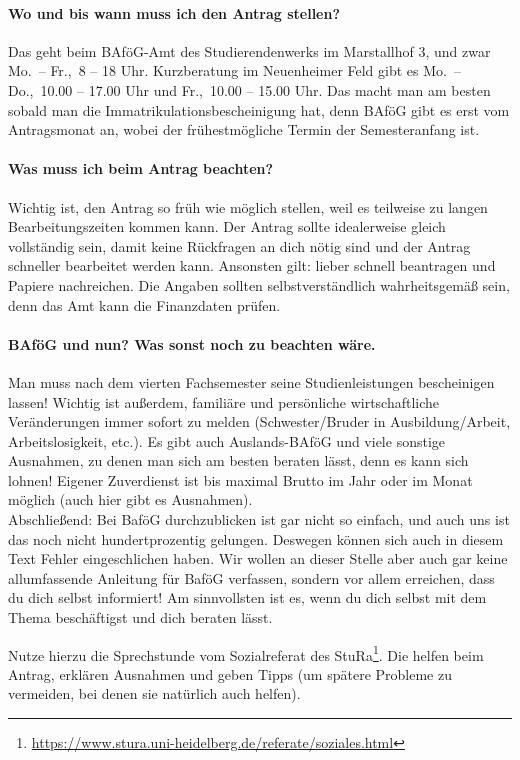 \paragraph{Wo und bis wann muss ich den Antrag stellen?}
Das geht beim BAföG-Amt des Studierendenwerks im Marstallhof 3, und zwar Mo.\ -- Fr.,\ 8 -- 18 Uhr. Kurzberatung im Neuenheimer Feld gibt es Mo.\ -- Do.,\ 10.00 -- 17.00 Uhr und Fr.,\ 10.00 -- 15.00 Uhr. Das macht man am besten sobald man die Immatrikulationsbescheinigung hat, denn BAföG gibt es erst vom Antragsmonat an, wobei der frühestmögliche Termin der Semesteranfang ist.

\paragraph{Was muss ich beim Antrag beachten?}
Wichtig ist, den Antrag so früh wie möglich stellen, weil es teilweise zu langen Bearbeitungszeiten kommen kann. Der Antrag sollte idealerweise gleich vollständig sein, damit keine Rückfragen an dich nötig sind und der Antrag schneller bearbeitet werden kann. Ansonsten gilt: lieber schnell beantragen und Papiere nachreichen. Die Angaben sollten selbstverständlich wahrheitsgemäß sein, denn das Amt kann die Finanzdaten prüfen.

\paragraph{BAföG und nun? Was sonst noch zu beachten wäre.}
Man muss nach dem vierten Fachsemester seine Studienleistungen bescheinigen lassen! Wichtig ist außerdem,  familiäre und persönliche wirtschaftliche Veränderungen immer sofort zu melden (Schwester/Bruder in Ausbildung/Arbeit, Arbeitslosigkeit, etc.). Es gibt auch Auslands-BAföG und viele sonstige Ausnahmen, zu denen man sich am besten beraten lässt, denn es kann sich lohnen! Eigener Zuverdienst ist bis maximal  Brutto im Jahr oder  im Monat möglich (auch hier gibt es Ausnahmen).\\[5mm]

\noindent Abschließend: Bei BaföG durchzublicken ist gar nicht so einfach, und auch uns ist das noch nicht hundertprozentig gelungen. Deswegen können sich auch in diesem Text Fehler eingeschlichen haben. Wir wollen an dieser Stelle aber auch gar keine allumfassende Anleitung für BaföG verfassen, sondern vor allem erreichen, dass du dich selbst informiert! Am sinnvollsten ist es, wenn du dich selbst mit dem Thema beschäftigst und dich beraten lässt.

Nutze hierzu die Sprechstunde vom Sozialreferat des \gls{StuRa}\footnote{\url{https://www.stura.uni-heidelberg.de/referate/soziales.html}}. Die helfen beim Antrag, erklären Ausnahmen und geben Tipps (um spätere Probleme zu vermeiden, bei denen sie natürlich auch helfen).
